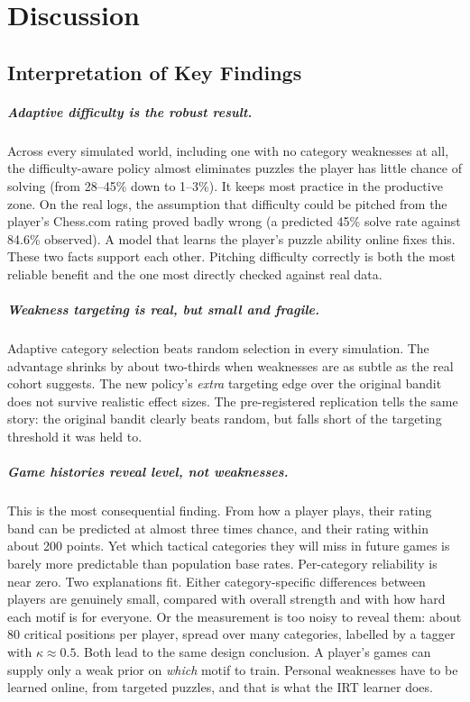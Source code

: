 \chapter{Discussion}\label{ch:discussion}

\section{Interpretation of Key Findings}

\paragraph{Adaptive difficulty is the robust result.} Across every simulated world, including one with
no category weaknesses at all, the difficulty-aware policy almost eliminates puzzles the player has
little chance of solving (from 28--45\% down to 1--3\%). It keeps most practice in the productive zone.
On the real logs, the assumption that difficulty could be pitched from the player's Chess.com rating
proved badly wrong (a predicted 45\% solve rate against 84.6\% observed). A model that learns the
player's puzzle ability online fixes this. These two facts support each other. Pitching difficulty
correctly is both the most reliable benefit and the one most directly checked against real data.

\paragraph{Weakness targeting is real, but small and fragile.} Adaptive category selection beats random
selection in every simulation. The advantage shrinks by about two-thirds when weaknesses are as subtle
as the real cohort suggests. The new policy's \emph{extra} targeting edge over the original bandit does
not survive realistic effect sizes. The pre-registered replication tells the same story: the original
bandit clearly beats random, but falls short of the targeting threshold it was held to.

\paragraph{Game histories reveal level, not weaknesses.} This is the most consequential finding. From
how a player plays, their rating band can be predicted at almost three times chance, and their rating
within about 200 points. Yet which tactical categories they will miss in future games is barely more
predictable than population base rates. Per-category reliability is near zero. Two explanations fit.
Either category-specific differences between players are genuinely small, compared with overall
strength and with how hard each motif is for everyone. Or the measurement is too noisy to reveal them:
about 80 critical positions per player, spread over many categories, labelled by a tagger with $\kappa
\approx 0.5$. Both lead to the same design conclusion. A player's games can supply only a weak prior on
\emph{which} motif to train. Personal weaknesses have to be learned online, from targeted puzzles, and
that is what the IRT learner does.


